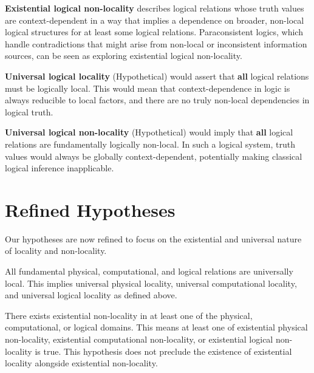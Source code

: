 	\begin{definition}
		\textbf{Existential logical non-locality} describes logical relations whose truth values are context-dependent in a way that implies a dependence on broader, non-local logical structures for at least some logical relations. Paraconsistent logics, which handle contradictions that might arise from non-local or inconsistent information sources, can be seen as exploring existential logical non-locality.
	\end{definition}
	
	\begin{definition}
		\textbf{Universal logical locality} (Hypothetical) would assert that \textbf{all} logical relations must be logically local. This would mean that context-dependence in logic is always reducible to local factors, and there are no truly non-local dependencies in logical truth.
	\end{definition}
	
	\begin{definition}
		\textbf{Universal logical non-locality} (Hypothetical) would imply that \textbf{all} logical relations are fundamentally logically non-local. In such a logical system, truth values would always be globally context-dependent, potentially making classical logical inference inapplicable.
	\end{definition}
	
	\section{Refined Hypotheses}
	
	Our hypotheses are now refined to focus on the existential and universal nature of locality and non-locality.
	
	\begin{hypothesis}
		All fundamental physical, computational, and logical relations are universally local.  This implies universal physical locality, universal computational locality, and universal logical locality as defined above.
	\end{hypothesis}
	
	\begin{hypothesis}
		There exists existential non-locality in at least one of the physical, computational, or logical domains.  This means at least one of existential physical non-locality, existential computational non-locality, or existential logical non-locality is true.  This hypothesis does not preclude the existence of existential locality alongside existential non-locality.
	\end{hypothesis}
	
